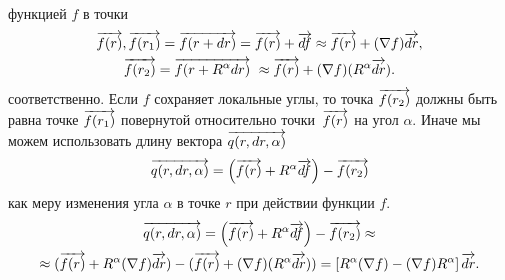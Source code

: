 функцией $f$ в точки 
\begin{multline*}
  \overrightarrow{f(r)}, 
  \overrightarrow{f(r_1)} = \overrightarrow{f(r + dr)} = \overrightarrow{f(r)} + \overrightarrow{df} \approx \overrightarrow{f(r)} + (\nabla f) \overrightarrow{dr}, \\
  \overrightarrow{f(r_2)} = \overrightarrow{f(r + R^\alpha dr)} ~\approx \overrightarrow{f(r)} + (\nabla f)(R^\alpha \overrightarrow{dr}).
\end{multline*}
соответственно. Если $f$ сохраняет локальные углы, то точка $\overrightarrow{f(r_2)}$ должны быть равна точке 
$\overrightarrow{f(r_1)}$ повернутой относительно точки~$\overrightarrow{f(r)}$ на угол $\alpha$. 
Иначе мы можем использовать длину вектора $\overrightarrow{q(r, dr, \alpha)}$
$$\overrightarrow{q(r, dr, \alpha)} = \left(\overrightarrow{f(r)} + R^\alpha \overrightarrow{df}\right) - \overrightarrow{f(r_2)}$$ 
как меру изменения угла $\alpha$ в точке $r$ при действии функции $f$.
\begin{multline}
\label{formula:angle_change_vec}
  \overrightarrow{q(r, dr, \alpha)} = \left(\overrightarrow{f(r)} + R^\alpha \overrightarrow{df} \right) - \overrightarrow{f(r_2)} \approx \\
  \approx (\overrightarrow{f(r)} + R^\alpha (\nabla f) \overrightarrow{dr}) - (\overrightarrow{f(r)} + (\nabla f)(R^\alpha \overrightarrow{dr})) =  
  \left[R^\alpha (\nabla f) - (\nabla f) R^\alpha \right] \overrightarrow{dr}. 
\end{multline}
